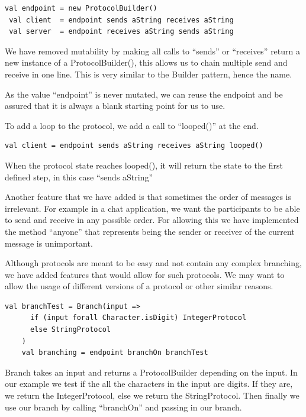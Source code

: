 \begin{lstlisting}[style=myScalastyle]
 val endpoint = new ProtocolBuilder()
 val client  = endpoint sends aString receives aString
 val server  = endpoint receives aString sends aString
\end{lstlisting}
We have removed mutability by making all calls to ``sends'' or ``receives'' return a new instance of a ProtocolBuilder(), this allows us to chain multiple send and receive in one line. This is very similar to the Builder pattern, hence the name.

As the value ``endpoint'' is never mutated, we can reuse the endpoint and be assured that it is always a blank starting point for us to use. 

To add a loop to the protocol, we add a call to ``looped()'' at the end.
\begin{lstlisting}[style=myScalastyle]
 val client = endpoint sends aString receives aString looped()
\end{lstlisting}
When the protocol state reaches looped(), it will return the state to the first defined step, in this case ``sends aString'' 

Another feature that we have added is that sometimes the order of messages is irrelevant. For example in a chat application, we want the participants to be able to send and receive in any possible order. For allowing this we have implemented the method ``anyone'' that represents being the sender or receiver of the current message is unimportant.

Although protocols are meant to be easy and not contain any complex branching, we have added features that would allow for such protocols. We may want to allow the usage of different versions of a protocol or other similar reasons.
\begin{lstlisting}[style=myScalastyle]
    val branchTest = Branch(input =>
      if (input forall Character.isDigit) IntegerProtocol
      else StringProtocol
    )
    val branching = endpoint branchOn branchTest
\end{lstlisting}
Branch takes an input and returns a ProtocolBuilder depending on the input. In our example we test if the all the characters in the input are digits. If they are, we return the IntegerProtocol, else we return the StringProtocol. Then finally we use our branch by calling ``branchOn'' and passing in our branch. 


